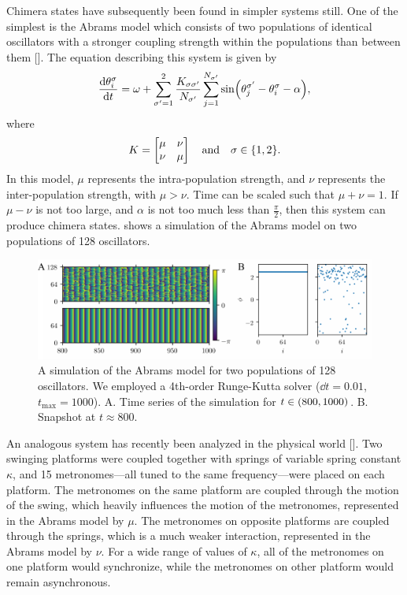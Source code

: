 Chimera states have subsequently been found in simpler systems still.
One of the simplest is the Abrams model which consists of two populations of identical oscillators with a stronger coupling strength within the populations than between them [].
The equation describing this system is given by
\begin{equation}
  \label{eq:abrams}
  \dv{\theta_{i}^{\sigma}}{t}
  =
  \omega
  +
  \sum_{\sigma' = 1}^{2} \frac{K_{\sigma \sigma'}}{N_{\sigma'}} \sum_{j = 1}^{N_{\sigma'}} \sin(\theta_{j}^{\sigma'} - \theta_{i}^{\sigma} - \alpha),
\end{equation}
where
\begin{equation*}
  K
  =
  \bmqty{\mu & \nu \\ \nu & \mu}
  \qand
  \sigma \in \Bqty{1, 2}.
\end{equation*}
In this model, $\mu$ represents the intra-population strength, and $\nu$ represents the inter-population strength, with $\mu > \nu$.
Time can be scaled such that $\mu + \nu = 1$.
If $\mu - \nu$ is not too large, and $\alpha$ is not too much less than $\frac{\pi}{2}$, then this system can produce chimera states.
 shows a simulation of the Abrams model on two populations of 128 oscillators.
\begin{figure}[ht]
  \centering
  \includegraphics[width=\textwidth]{figure/abrams.pdf}
  \caption[Abrams simulation]{A simulation of the Abrams model for two populations of 128 oscillators.
    We employed a 4th-order Runge-Kutta solver ($\dd{t} = 0.01$, $t_{\text{max}} = 1000$).
    A. Time series of the simulation for $t \in \pqty{800, 1000}$.
    B. Snapshot at $t \approx 800$.
  }
  \label{fig:abrams}
\end{figure}

An analogous system has recently been analyzed in the physical world [].
Two swinging platforms were coupled together with springs of variable spring constant $\kappa$, and 15 metronomes---all tuned to the same frequency---were placed on each platform.
The metronomes on the same platform are coupled through the motion of the swing, which heavily influences the motion of the metronomes, represented in the Abrams model by $\mu$.
The metronomes on opposite platforms are coupled through the springs, which is a much weaker interaction, represented in the Abrams model by $\nu$.
For a wide range of values of $\kappa$, all of the metronomes on one platform would synchronize, while the metronomes on other platform would remain asynchronous.


